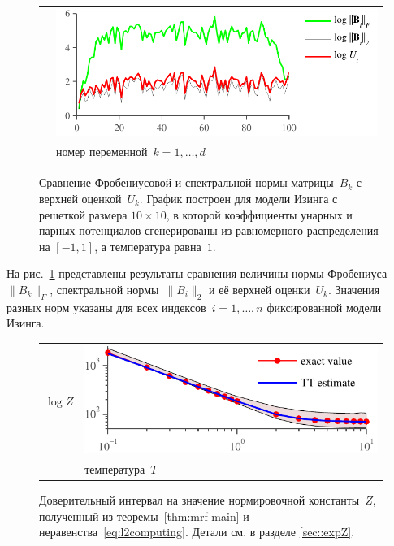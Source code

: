  \begin{figure}
 \begin{center}
 \begin{tabular}{m{0.3cm}@{}m{12cm}}
 \begin{sideways}\parbox{4cm}{\centering\scriptsize   }\end{sideways}
 & \includegraphics[width=12cm]{images/2norm.pdf}
 \\
 & \parbox{10.3cm}{\centering\scriptsize номер переменной~$k=1,\ldots,d$ } \\
 \end{tabular}
 \end{center}
 \caption{ Сравнение Фробениусовой и спектральной нормы матрицы~$B_k$ с верхней оценкой~$U_k$. График построен для модели Изинга с решеткой размера $10 \times 10$, в которой коэффициенты унарных и парных потенциалов сгенерированы из равномерного распределения на $[-1, 1]$, а температура равна~$1$.
 \label{fig:zUpperBound}}
 \end{figure}
 На рис.~\ref{fig:zUpperBound} представлены результаты сравнения величины нормы Фробениуса~$\|B_k\|_F$, спектральной нормы~$\|B_i\|_2$ и её верхней оценки~$U_k$. Значения разных норм указаны для всех индексов~$i = 1, \ldots, n$ фиксированной модели Изинга.



 \begin{figure}
 \begin{center}
 \begin{tabular}{m{0.3cm}@{}m{12cm}}
 \begin{sideways}\parbox{4cm}{\centering\scriptsize  $\log Z$ }\end{sideways}
 & \includegraphics[width=12cm]{images/10x10,J=1,average=10,confInt_v3.pdf}
 \\
 & \parbox{12.3cm}{\centering\scriptsize температура~$T$} \\
 \end{tabular}
 \end{center}
 \caption{Доверительный интервал на значение нормировочной константы~$Z$, полученный из теоремы~\ref{thm:mrf-main} и неравенства~\eqref{eq:l2computing}. Детали см. в разделе \ref{sec::expZ}.  \label{fig:zConf}}
 \end{figure}


